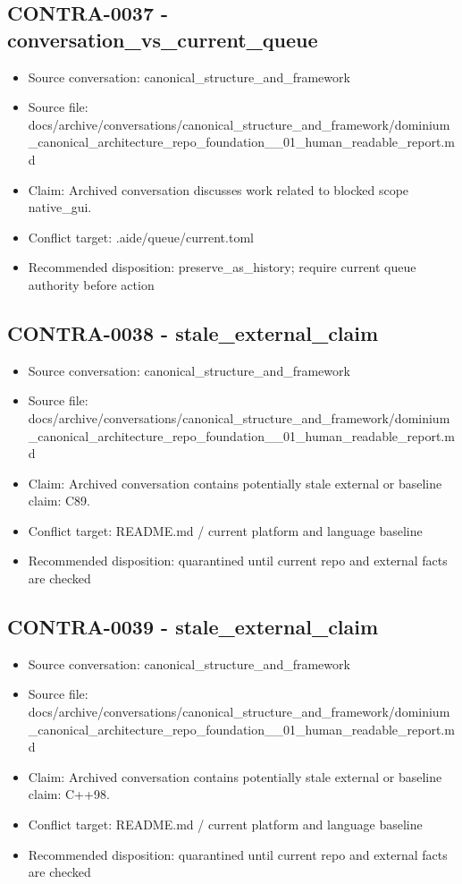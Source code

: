 \documentclass[11pt,a4paper]{report}
\begin{document}
\subsection{CONTRA-0037 - conversation\_vs\_current\_queue}

\begin{itemize}
\item Source conversation: canonical\_structure\_and\_framework
\item Source file: docs/archive/conversations/canonical\_structure\_and\_framework/dominium\_canonical\_architecture\_repo\_foundation\_\_01\_human\_readable\_report.md
\item Claim: Archived conversation discusses work related to blocked scope native\_gui.
\item Conflict target: .aide/queue/current.toml
\item Recommended disposition: preserve\_as\_history; require current queue authority before action
\end{itemize}

\subsection{CONTRA-0038 - stale\_external\_claim}

\begin{itemize}
\item Source conversation: canonical\_structure\_and\_framework
\item Source file: docs/archive/conversations/canonical\_structure\_and\_framework/dominium\_canonical\_architecture\_repo\_foundation\_\_01\_human\_readable\_report.md
\item Claim: Archived conversation contains potentially stale external or baseline claim: C89.
\item Conflict target: README.md / current platform and language baseline
\item Recommended disposition: quarantined until current repo and external facts are checked
\end{itemize}

\subsection{CONTRA-0039 - stale\_external\_claim}

\begin{itemize}
\item Source conversation: canonical\_structure\_and\_framework
\item Source file: docs/archive/conversations/canonical\_structure\_and\_framework/dominium\_canonical\_architecture\_repo\_foundation\_\_01\_human\_readable\_report.md
\item Claim: Archived conversation contains potentially stale external or baseline claim: C++98.
\item Conflict target: README.md / current platform and language baseline
\item Recommended disposition: quarantined until current repo and external facts are checked
\end{itemize}
\end{document}
